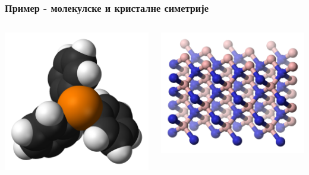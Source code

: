 \documentclass{beamer}
\theoremstyle{plain}
\theoremstyle{definition}
\begin{document}
\begin{frame}
\frametitle{Пример - молекулске и кристалне симетрије}
\begin{columns}[T]
    \begin{column}{0.5\textwidth}
      \centering
      \includegraphics[width=\textwidth]{molekul1}
    \end{column}
    \begin{column}{0.5\textwidth}
      \centering
      \includegraphics[width=\textwidth]{resetka}
    \end{column}
\end{columns}
\end{frame}
\end{document}
